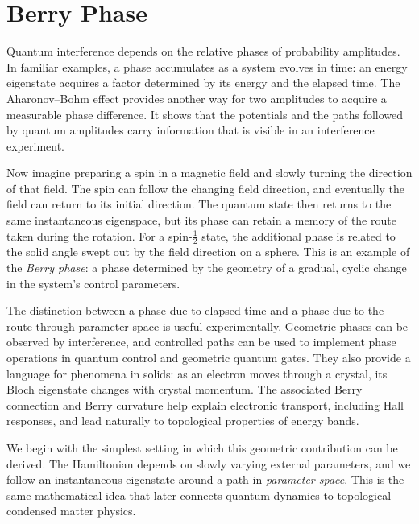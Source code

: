 \section{Berry Phase}

Quantum interference depends on the relative phases of probability amplitudes. In familiar examples, a phase accumulates as a system evolves in time: an energy eigenstate acquires a factor determined by its energy and the elapsed time. The Aharonov--Bohm effect provides another way for two amplitudes to acquire a measurable phase difference. It shows that the potentials and the paths followed by quantum amplitudes carry information that is visible in an interference experiment.

Now imagine preparing a spin in a magnetic field and slowly turning the direction of that field. The spin can follow the changing field direction, and eventually the field can return to its initial direction. The quantum state then returns to the same instantaneous eigenspace, but its phase can retain a memory of the route taken during the rotation. For a spin-$\frac12$ state, the additional phase is related to the solid angle swept out by the field direction on a sphere. This is an example of the \emph{Berry phase}: a phase determined by the geometry of a gradual, cyclic change in the system's control parameters.

The distinction between a phase due to elapsed time and a phase due to the route through parameter space is useful experimentally. Geometric phases can be observed by interference, and controlled paths can be used to implement phase operations in quantum control and geometric quantum gates. They also provide a language for phenomena in solids: as an electron moves through a crystal, its Bloch eigenstate changes with crystal momentum. The associated Berry connection and Berry curvature help explain electronic transport, including Hall responses, and lead naturally to topological properties of energy bands.

We begin with the simplest setting in which this geometric contribution can be derived. The Hamiltonian depends on slowly varying external parameters, and we follow an instantaneous eigenstate around a path in \emph{parameter space}. This is the same mathematical idea that later connects quantum dynamics to topological condensed matter physics.

